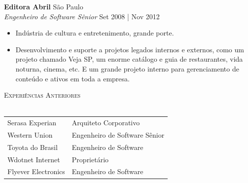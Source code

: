 \documentclass[a4paper]{article}
\newcommand{\lineunder} {
    \vspace*{-8pt} \\
    \hspace*{-18pt} \hrulefill \\
}
\newcommand{\header} [1] {
    {\hspace*{-18pt}\vspace*{6pt} \textsc{#1}}
    \vspace*{-6pt} \lineunder
}
\begin{document}
\textbf{Editora Abril} \hfill São Paulo\\
\textit{Engenheiro de Software Sênior} \hfill Set 2008 | Nov 2012\\
\vspace{-3mm}
\begin{itemize}
	\setlength\itemsep{-1mm}
	\item Indústria de cultura e entretenimento, grande porte. 
\item Desenvolvimento e suporte a projetos legados internos e externos, como um projeto chamado Veja SP, um enorme catálogo e guia de restaurantes, vida noturna, cinema, etc. E um grande projeto interno para gerenciamento de conteúdo e ativos em toda a empresa. 
\end{itemize}
\vspace{-2.5mm}

\header{Experiências Anteriores}
\vspace{1.5mm}
\begin{tabular}{ @{}l l }
    Serasa Experian & Arquiteto Corporativo \\
    Western Union & Engenheiro de Software Sênior \\
    Toyota do Brasil & Engenheiro de Software    \\
    Wdotnet Internet & Proprietário    \\
    Flyever Electronics & Engenheiro de Software \\
\end{tabular}
\vspace{1.5mm}
\end{document}
